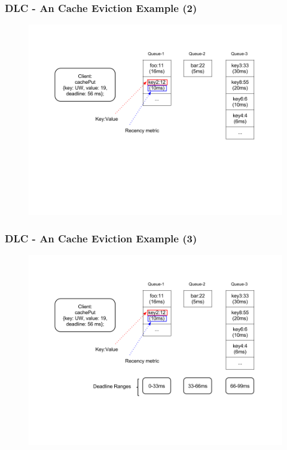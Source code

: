 \documentclass{beamer}
\begin{document}
\begin{frame}
  \frametitle{DLC - An Cache Eviction Example (2)}
  \begin{figure}
    \begin{center}
      \centerline{\includegraphics[scale=0.33]{img/DLC_NEW_2.png}}
    \end{center}
  \end{figure}
\end{frame}

\begin{frame}
  \frametitle{DLC - An Cache Eviction Example (3)}
  \begin{figure}
    \begin{center}
      \centerline{\includegraphics[scale=0.33]{img/DLC_NEW_3.png}}
    \end{center}
  \end{figure}
\end{frame}
\end{document}
